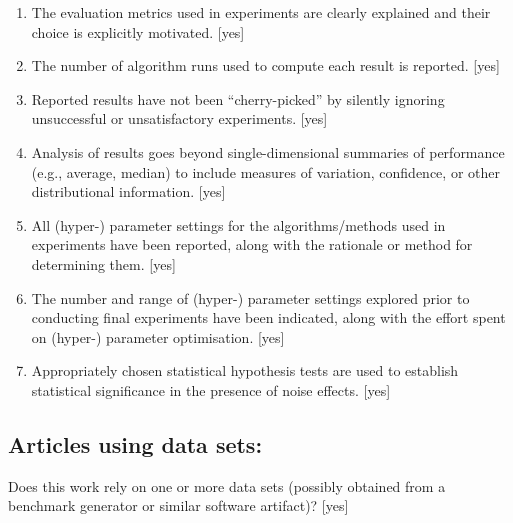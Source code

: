 \documentclass[]{amsart}
\theoremstyle{plain}
\begin{document}
\begin{enumerate}
    [yes]
    \item 
    The evaluation metrics used in experiments are clearly explained and their choice is explicitly motivated. 
    [yes]
    \item 
    The number of algorithm runs used to compute each result is reported. 
    [yes]
    \item 
    Reported results have not been ``cherry-picked'' by silently ignoring unsuccessful or unsatisfactory experiments. 
    [yes]
    \item 
    Analysis of results goes beyond single-dimensional summaries of performance (e.g., average, median) to include measures of variation, confidence, or other distributional information. 
    [yes]
    \item 
    All (hyper-) parameter settings for 
    the algorithms/methods used in experiments have been reported, along with the rationale or method for determining them. 
    [yes]
    \item 
    The number and range of (hyper-) parameter settings explored prior to conducting final experiments have been indicated, along with the effort spent on (hyper-) parameter optimisation. 
    [yes]
    \item 
    Appropriately chosen statistical hypothesis tests are used to establish statistical significance
    in the presence of noise effects.
    [yes]
\end{enumerate}


\subsection*{Articles using data sets:}
Does this work rely on one or more data sets (possibly obtained from a benchmark generator or similar software artifact)? 
[yes]
\end{document}

